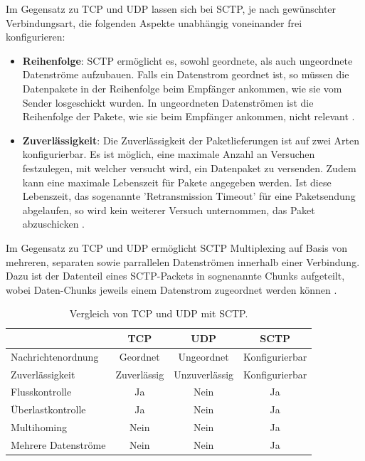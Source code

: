 Im Gegensatz zu \acs{TCP} und \acs{UDP} lassen sich bei \acs{SCTP}, je nach gewünschter Verbindungsart, die folgenden Aspekte unabhängig voneinander frei konfigurieren:
\begin{itemize}
	\item\textbf{Reihenfolge}: \acs{SCTP} ermöglicht es, sowohl geordnete, als auch ungeordnete Datenströme aufzubauen. Falls ein Datenstrom geordnet ist, so müssen die Datenpakete in der Reihenfolge beim Empfänger ankommen, wie sie vom Sender losgeschickt wurden. In ungeordneten Datenströmen ist die Reihenfolge der Pakete, wie sie beim Empfänger ankommen, nicht relevant \cite{sctpRFC}.
	\item\textbf{Zuverlässigkeit}: Die Zuverlässigkeit der Paketlieferungen ist auf zwei Arten konfigurierbar. Es ist möglich, eine maximale Anzahl an Versuchen festzulegen, mit welcher versucht wird, ein Datenpaket zu versenden. Zudem kann eine maximale Lebenszeit für Pakete angegeben werden. Ist diese Lebenszeit, das sogenannte 'Retransmission Timeout' für eine Paketsendung abgelaufen, so wird kein weiterer Versuch unternommen, das Paket abzuschicken \cite{sctpRFC}.
\end{itemize}

\vspace{11pt}

Im Gegensatz zu \acs{TCP} und \acs{UDP} ermöglicht \acs{SCTP} Multiplexing auf Basis von mehreren, separaten sowie parrallelen Datenströmen innerhalb einer Verbindung. Dazu ist der Datenteil eines \acs{SCTP}-Packets in sognenannte \glqq{}Chunks\grqq{}  aufgeteilt, wobei Daten-Chunks jeweils einem Datenstrom zugeordnet werden können \cite{sctpRFC}.\par

\begin{table}[ht]
\centering
\begin{tabular}[t]{lccc}
\toprule
&TCP&UDP&SCTP\\
\midrule
Nachrichtenordnung&Geordnet&Ungeordnet&Konfigurierbar\\
Zuverlässigkeit&Zuverlässig&Unzuverlässig&Konfigurierbar\\
Flusskontrolle&Ja&Nein&Ja\\
Überlastkontrolle &Ja&Nein&Ja\\
Multihoming&Nein&Nein&Ja\\
Mehrere Datenströme&Nein&Nein&Ja\\
\bottomrule
\end{tabular}
\caption{Vergleich von \acs{TCP} und \acs{UDP} mit \acs{SCTP}.}
\label{table:vergleichNetzwerkProtokolle}
\end{table}

